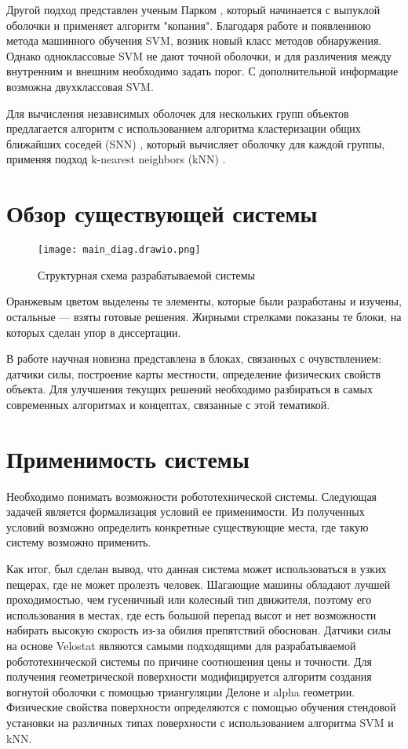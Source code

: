 Другой подход представлен ученым Парком \cite{parkNewConcaveHull2012}, который начинается с выпуклой оболочки и применяет алгоритм "копания". Благодаря работе \cite{j.a.leonardUsingRadialBasis1992} и появлениюю метода машинного обучения  SVM, возник новый класс методов обнаружения. Однако одноклассовые SVM не дают точной оболочки, и для различения между внутренним и внешним необходимо задать порог. С дополнительной информацие возможна двухклассовая SVM. 

Для вычисления независимых оболочек для нескольких групп объектов предлагается алгоритм с использованием алгоритма кластеризации общих ближайших соседей (SNN) , который вычисляет оболочку для каждой группы, применяя подход k-nearest neighbors (kNN) \cite{moreiraConcaveHullKnearest2007,ertozNewSharedNearest2002,chauBorderSamplesDetection2011,xiaBORDEREfficientComputation2006}.

\section{Обзор существующей системы}
\begin{figure}[H]
    \centering\texttt{[image: main\_diag.drawio.png]}
    \caption{Структурная схема разрабатываемой системы}
    \label{fig:diag_system.png}
\end{figure}

Оранжевым цветом выделены те элементы, которые были разработаны и изучены, остальные --- взяты готовые решения. Жирными стрелками показаны те блоки, на которых сделан упор в диссертации.

В работе научная новизна представлена в блоках, связанных с очувствлением: датчики силы, построение карты местности, определение физических свойств объекта. Для улучшения текущих решений необходимо разбираться в самых современных алгоритмах и концептах, связанные с этой тематикой.


\section{Применимость системы}
Необходимо понимать возможности робототехнической системы. Следующая задачей является формализация условий ее применимости. Из полученных условий возможно определить конкретные существующие места, где такую систему возможно применить.

Как итог, был сделан вывод, что данная система может использоваться в узких пещерах, где не может пролезть человек. Шагающие машины обладают лучшей проходимостью, чем гусеничный или колесный тип движителя, поэтому его использования в местах, где есть большой перепад высот и нет возможности набирать высокую скорость из-за обилия препятствий обоснован. Датчики силы на основе Velostat являются самыми подходящими для разрабатываемой робототехнической системы по причине соотношения цены и точности. Для получения геометрической поверхности модифицируется алгоритм создания вогнутой оболочки с помощью триангуляции Делоне и alpha геометрии. Физические свойства поверхности определяются с помощью обучения стендовой установки на различных типах поверхности с использованием алгоритма SVM и kNN.